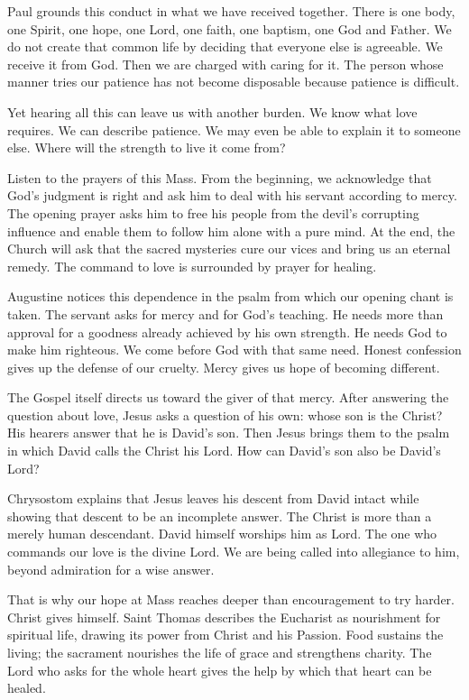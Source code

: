 Paul grounds this conduct in what we have received together. There is one body, one Spirit, one hope, one Lord, one faith, one baptism, one God and Father. We do not create that common life by deciding that everyone else is agreeable. We receive it from God. Then we are charged with caring for it. The person whose manner tries our patience has not become disposable because patience is difficult.

Yet hearing all this can leave us with another burden. We know what love requires. We can describe patience. We may even be able to explain it to someone else. Where will the strength to live it come from?

Listen to the prayers of this Mass. From the beginning, we acknowledge that God's judgment is right and ask him to deal with his servant according to mercy. The opening prayer asks him to free his people from the devil's corrupting influence and enable them to follow him alone with a pure mind. At the end, the Church will ask that the sacred mysteries cure our vices and bring us an eternal remedy. The command to love is surrounded by prayer for healing.

Augustine notices this dependence in the psalm from which our opening chant is taken. The servant asks for mercy and for God's teaching. He needs more than approval for a goodness already achieved by his own strength. He needs God to make him righteous. We come before God with that same need. Honest confession gives up the defense of our cruelty. Mercy gives us hope of becoming different.

The Gospel itself directs us toward the giver of that mercy. After answering the question about love, Jesus asks a question of his own: whose son is the Christ? His hearers answer that he is David's son. Then Jesus brings them to the psalm in which David calls the Christ his Lord. How can David's son also be David's Lord?

Chrysostom explains that Jesus leaves his descent from David intact while showing that descent to be an incomplete answer. The Christ is more than a merely human descendant. David himself worships him as Lord. The one who commands our love is the divine Lord. We are being called into allegiance to him, beyond admiration for a wise answer.

That is why our hope at Mass reaches deeper than encouragement to try harder. Christ gives himself. Saint Thomas describes the Eucharist as nourishment for spiritual life, drawing its power from Christ and his Passion. Food sustains the living; the sacrament nourishes the life of grace and strengthens charity. The Lord who asks for the whole heart gives the help by which that heart can be healed.

